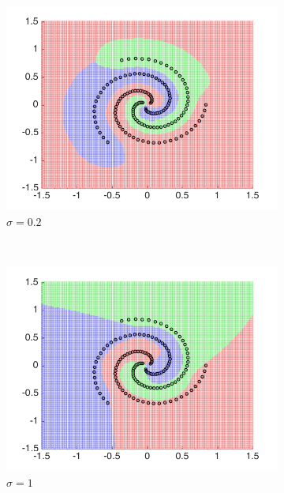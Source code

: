 \documentclass[10pt,twocolumn,letterpaper]{article}
\begin{document}
\begin{figure}

\begin{subfigure}[H]{0.3 \columnwidth}
\includegraphics[width = 1\columnwidth]{q2_ovr_sig02}\hfill
\caption{$\sigma = 0.2$}
\end{subfigure}
~
\begin{subfigure}[H]{0.3 \columnwidth}
	\includegraphics[width = 1\columnwidth]{q2_ovr_sig1}
	\caption{$\sigma = 1$}
\end{subfigure}
~
\begin{subfigure}[H]{0.3 \columnwidth}

\end{subfigure}
\end{figure}
\end{document}
